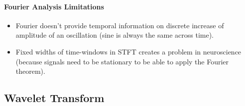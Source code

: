 \paragraph{Fourier Analysis Limitations}
\begin{itemize}
    \item Fourier doesn't provide temporal information on discrete increase of amplitude of an oscillation (sine is always the 
    same across time).
    \item Fixed widths of time-windows in STFT creates a problem in neuroscience (because signals need to be stationary to be 
    able to apply the Fourier theorem).
\end{itemize}

\subsection{Wavelet Transform}
